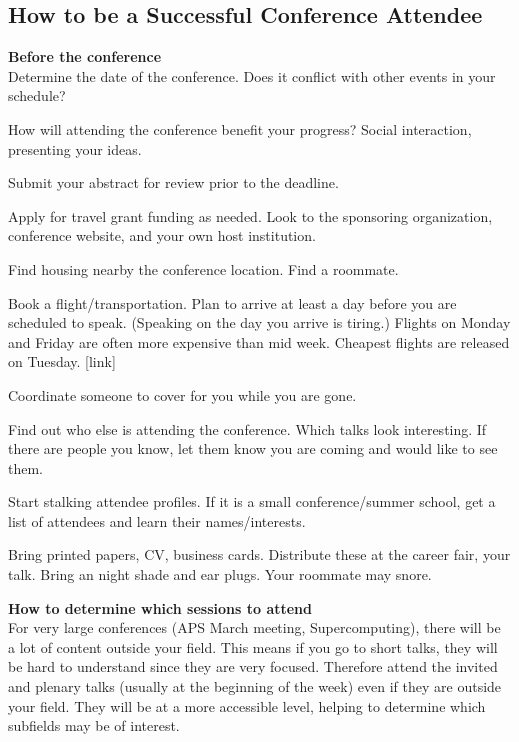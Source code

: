 \subsection{How to be a Successful Conference Attendee}


\textbf{Before the conference}\\

Determine the date of the conference. Does it conflict with other events in your schedule?

How will attending the conference benefit your progress? Social interaction, presenting your ideas.

Submit your abstract for review prior to the deadline.

Apply for travel grant funding as needed. Look to the sponsoring organization, conference website, and your own host institution.

Find housing nearby the conference location. Find a roommate.

Book a flight/transportation. Plan to arrive at least a day before you are scheduled to speak. (Speaking on the day you arrive is tiring.) Flights on Monday and Friday are often more expensive than mid week. Cheapest flights are released on Tuesday. [link]

Coordinate someone to cover for you while you are gone.

Find out who else is attending the conference. Which talks look interesting. If there are people you know, let them know you are coming and would like to see them.

Start stalking attendee profiles. If it is a small conference/summer school, get a list of attendees and learn their names/interests.

Bring printed papers, CV, business cards. Distribute these at the career fair, your talk. Bring an night shade and ear plugs. Your roommate may snore.

\textbf{How to determine which sessions to attend}\\

For very large conferences (APS March meeting, Supercomputing), there will be a lot of content outside your field. This means if you go to short talks, they will be hard to understand since they are very focused. Therefore attend the invited and plenary talks (usually at the beginning of the week) even if they are outside your field. They will be at a more accessible level, helping to determine which subfields may be of interest.

